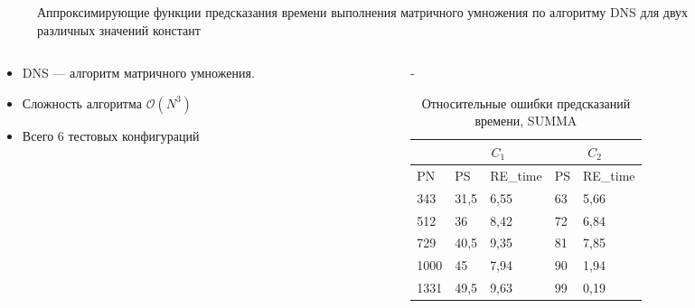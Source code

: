 \documentclass[unicode, t, 11pt]{beamer}%
\newlength{\mylen}
\begin{document}
\begin{frame}
				\begin{figure}
					\captionsetup{font=tiny, labelfont=tiny}
					\centering
					\caption{Аппроксимирующие функции предсказания времени выполнения матричного умножения по алгоритму DNS для двух различных значений констант}
				\end{figure}
				\begin{columns}[T]
					\setlength{\mylen}{0.4\textwidth}
					\begin{column}{\mylen}
						\begin{itemize}[label = \(\bullet\)]
					 		\item DNS — алгоритм матричного умножения.
					 		\item Сложность алгоритма \(\mathcal{O}(N^3)\)
					 		\item Всего 6 тестовых конфигураций
					 	\end{itemize}
					\end{column}
					\begin{column}{\dimexpr\textwidth-\mylen}
						\begin{table}
				 			\captionsetup{font=tiny, labelfont=tiny}
				 			\tiny
								\begin{tabularx}{\textwidth}{|X|X|X||X|X|}
								\hline
						             & \multicolumn{2}{c||}{\(C_1\)} & \multicolumn{2}{c|}{\(C_2\)} \\ \hline
						        PN   & PS   & RE\_time & PS & RE\_time          \\ \hline
						        343  & 31,5 & 6,55     & 63 & 5,66              \\ \hline
						        512  & 36   & 8,42     & 72 & 6,84              \\ \hline
						        729  & 40,5 & 9,35     & 81 & 7,85              \\ \hline
						        1000 & 45   & 7,94     & 90 & 1,94              \\ \hline
						        1331 & 49,5 & 9,63     & 99 & 0,19              \\ \hline
								\end{tabularx}
							\caption{Относительные ошибки предсказаний времени, SUMMA}
						\end{table}
					\end{column}
				\end{columns}
			\end{frame}
\end{document}
